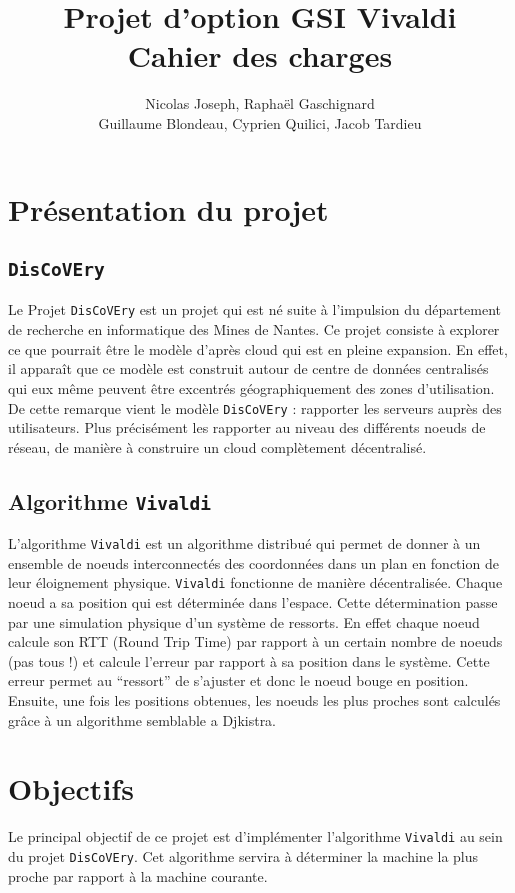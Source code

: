 \documentclass[11pt,a4paper]{article}
\title{Projet d'option GSI Vivaldi \\ Cahier des charges}
\author{Nicolas Joseph, Raphaël Gaschignard\\ Guillaume Blondeau, Cyprien Quilici, Jacob Tardieu}
\begin{document}
\maketitle
\section{Présentation du projet}
\subsection{\texttt{DisCoVEry}}

Le Projet \texttt{DisCoVEry} est un projet qui est né suite à l’impulsion du département de recherche en informatique des Mines de Nantes. Ce projet consiste à explorer ce que pourrait être le modèle d’après cloud qui est en pleine expansion. En effet, il apparaît que ce modèle est construit autour de centre de données centralisés qui eux même peuvent être excentrés géographiquement des zones d’utilisation. De cette remarque vient  le modèle \texttt{DisCoVEry} : rapporter les serveurs auprès des utilisateurs. Plus précisément les rapporter au niveau des différents noeuds de réseau, de manière à construire un cloud complètement décentralisé.

\subsection{Algorithme \texttt{Vivaldi}}
L'algorithme \texttt{Vivaldi} \cite{vivaldi} est un algorithme distribué qui permet  de donner à un ensemble de noeuds interconnectés des coordonnées dans un plan en fonction de leur éloignement physique.
\texttt{Vivaldi} fonctionne de manière décentralisée. Chaque noeud a sa position qui est déterminée dans l’espace. Cette détermination passe par une simulation physique d’un système de ressorts. En effet chaque noeud calcule son RTT (Round Trip Time) par rapport à un certain nombre de noeuds (pas tous !) et calcule l’erreur par rapport à sa position dans le système. Cette erreur permet au “ressort” de s’ajuster et donc le noeud bouge en position.
Ensuite, une fois les positions obtenues, les noeuds les plus proches sont calculés grâce à un algorithme semblable a Djkistra.

\section{Objectifs}
Le principal objectif de ce projet est d'implémenter l'algorithme \texttt{Vivaldi} au sein du projet \texttt{DisCoVEry}. Cet algorithme servira à déterminer la machine la plus proche par rapport à la machine courante.\\
\end{document}
